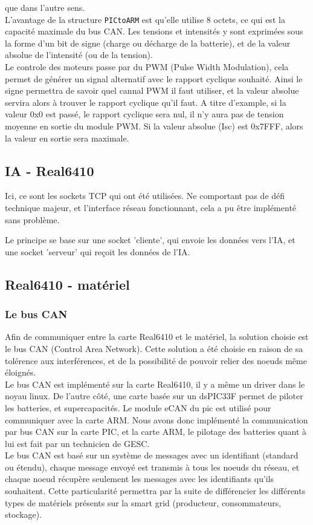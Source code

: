 \documentclass[a4,french,12pt]{article}
\begin{document}
que dans l'autre sens. \\
L'avantage de la structure \texttt{PICtoARM} est qu'elle utilise 8 octets, ce qui est la capacité maximale du bus CAN. 
Les tensions et intensités y sont exprimées sous la forme d'un bit de signe (charge ou décharge de la batterie), et de la 
valeur absolue de l'intensité (ou de la tension). \\
Le controle des moteurs passe par du PWM (Pulse Width Modulation), cela permet de générer un signal alternatif avec le 
rapport cyclique souhaité. Ainsi le signe permettra de savoir quel cannal PWM il faut utiliser, et la valeur absolue 
servira alors à trouver le rapport cyclique qu'il faut. A titre d'example, si la valeur 0x0 est passé, le rapport cyclique 
sera nul, il n'y aura pas de tension moyenne en sortie du module PWM. Si la valeur absolue (Isc) est 0x7FFF, alors la valeur
 en sortie sera maximale.

\subsection{IA - Real6410}

Ici, ce sont les sockets TCP qui ont été utilisées. Ne comportant pas de défi technique majeur, et l'interface réseau fonctionnant, cela a pu être implémenté sans problème.

Le principe se base sur une socket 'cliente', qui envoie les données vers l'IA, et une socket 'serveur' qui reçoit les données de l'IA.




\subsection{Real6410 - matériel}
\subsubsection{Le bus CAN}
Afin de communiquer entre la carte Real6410 et le matériel, la solution choisie est le bus CAN (Control Area Network). Cette 
solution a été choisie en raison de sa tolérence aux interférences, et de la possibilité de pouvoir relier des noeuds même 
éloignés. \\
Le bus CAN est implémenté sur la carte Real6410, il y a même un driver dans le noyau linux. De l'autre côté, une carte 
basée sur un dsPIC33F permet de piloter les batteries, et supercapacités. Le module eCAN du pic est utilisé pour 
communiquer avec la carte ARM. Nous avons donc implémenté la communication par bus CAN sur la carte PIC, et la carte ARM, 
le pilotage des batteries quant à lui est fait par un technicien de GESC. \\
Le bus CAN est basé sur un système de messages avec un identifiant (standard ou étendu), chaque message envoyé est transmis 
à tous les noeuds du réseau, et chaque noeud récupère seulement les messages avec les identifiants qu'ils souhaitent. Cette 
particularité permettra par la suite de différencier les différents types de matériels présents sur la smart grid 
(producteur, consommateurs, stockage).
\end{document}
